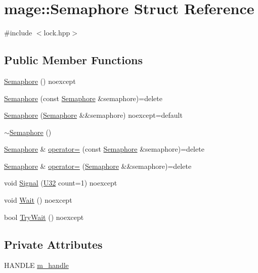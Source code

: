 \hypertarget{structmage_1_1_semaphore}{}\section{mage\+:\+:Semaphore Struct Reference}
\label{structmage_1_1_semaphore}


{\ttfamily \#include $<$lock.\+hpp$>$}

\subsection*{Public Member Functions}
\begin{DoxyCompactItemize}
\item 
\hyperlink{structmage_1_1_semaphore_a3733a67071b832a57ec086d52b28fd84}{Semaphore} () noexcept
\item 
\hyperlink{structmage_1_1_semaphore_a8873b2ed82ff66d323a8c3cebf0fb5c0}{Semaphore} (const \hyperlink{structmage_1_1_semaphore}{Semaphore} \&semaphore)=delete
\item 
\hyperlink{structmage_1_1_semaphore_abe3e33b06c3cb3cbfe3fa041ef80434f}{Semaphore} (\hyperlink{structmage_1_1_semaphore}{Semaphore} \&\&semaphore) noexcept=default
\item 
\hyperlink{structmage_1_1_semaphore_a991ed365c28e4a9c63ff34a5efeb012d}{$\sim$\+Semaphore} ()
\item 
\hyperlink{structmage_1_1_semaphore}{Semaphore} \& \hyperlink{structmage_1_1_semaphore_af3308cf7fa1ed33cda0ee53b9565f658}{operator=} (const \hyperlink{structmage_1_1_semaphore}{Semaphore} \&semaphore)=delete
\item 
\hyperlink{structmage_1_1_semaphore}{Semaphore} \& \hyperlink{structmage_1_1_semaphore_a7ce33136147e745f75d51abc77cd845c}{operator=} (\hyperlink{structmage_1_1_semaphore}{Semaphore} \&\&semaphore)=delete
\item 
void \hyperlink{structmage_1_1_semaphore_a0b7948e009f0fbdad2b2dc5e9fc420d7}{Signal} (\hyperlink{namespacemage_a41c104c036fba3756a74e19f793eeaa1}{U32} count=1) noexcept
\item 
void \hyperlink{structmage_1_1_semaphore_ab0be313e63792315ee9b227dea1184be}{Wait} () noexcept
\item 
bool \hyperlink{structmage_1_1_semaphore_a46d08edac69437678d05f354f10619de}{Try\+Wait} () noexcept
\end{DoxyCompactItemize}
\subsection*{Private Attributes}
\begin{DoxyCompactItemize}
\item 
H\+A\+N\+D\+LE \hyperlink{structmage_1_1_semaphore_ac1ded856984b4ac3739d9ff627838fda}{m\+\_\+handle}
\end{DoxyCompactItemize}


